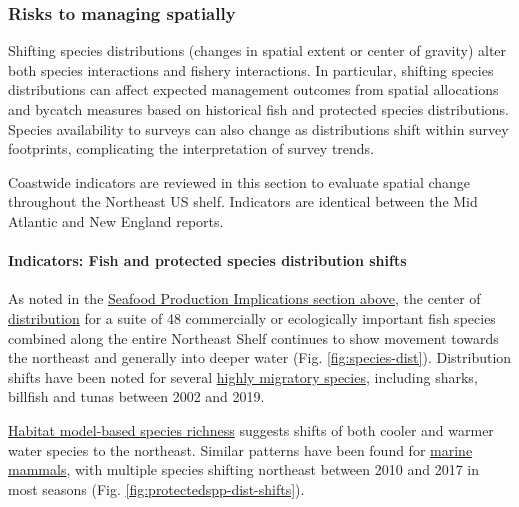 \documentclass[
  10pt,
]{article}
\begin{document}
\subsubsection{Risks to managing spatially}\label{risks-to-managing-spatially}

Shifting species distributions (changes in spatial extent or center of gravity) alter both species interactions and fishery interactions. In particular, shifting species distributions can affect expected management outcomes from spatial allocations and bycatch measures based on historical fish and protected species distributions. Species availability to surveys can also change as distributions shift within survey footprints, complicating the interpretation of survey trends.

Coastwide indicators are reviewed in this section to evaluate spatial change throughout the Northeast US shelf. Indicators are identical between the Mid Atlantic and New England reports.

\paragraph{Indicators: Fish and protected species distribution shifts}\label{indicators-fish-and-protected-species-distribution-shifts}

As noted in the \hyperref[implications]{Seafood Production Implications section above}, the center of \href{https://noaa-edab.github.io/catalog/species_dist.html}{distribution} for a suite of 48 commercially or ecologically important fish species combined along the entire Northeast Shelf continues to show movement towards the northeast and generally into deeper water (Fig. \ref{fig:species-dist}). Distribution shifts have been noted for several \href{https://noaa-edab.github.io/catalog/species_dist.html}{highly migratory species}, including sharks, billfish and tunas between 2002 and 2019.

\href{https://noaa-edab.github.io/catalog/habitat_diversity.html}{Habitat model-based species richness} suggests shifts of both cooler and warmer water species to the northeast. Similar patterns have been found for \href{https://noaa-edab.github.io/catalog/cetacean_dist.html}{marine mammals}, with multiple species shifting northeast between 2010 and 2017 in most seasons (Fig. \ref{fig:protectedspp-dist-shifts}).
\end{document}
